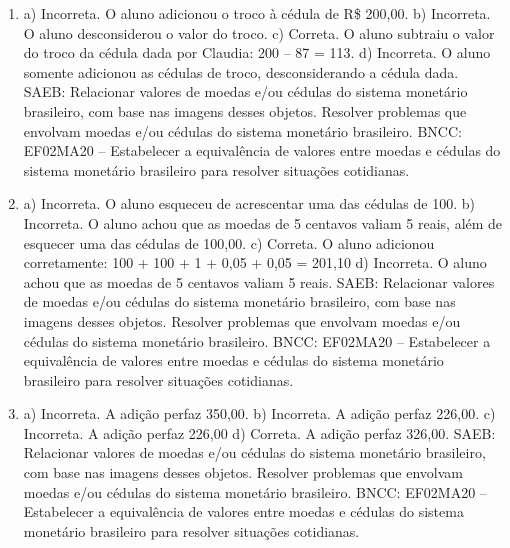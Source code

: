 \begin{enumerate}
\item
a) Incorreta. O aluno adicionou o troco à cédula de R\$ 200,00.
b) Incorreta. O aluno desconsiderou o valor do troco.
c) Correta. O aluno subtraiu o valor do troco da cédula dada por Claudia: 200 -- 87 = 113.
d) Incorreta. O aluno somente adicionou as cédulas de troco, desconsiderando a cédula dada.
SAEB: Relacionar valores de moedas e/ou cédulas do sistema
monetário brasileiro, com base nas imagens desses objetos.
Resolver problemas que envolvam moedas e/ou cédulas do sistema
monetário brasileiro.
BNCC: EF02MA20 -- Estabelecer a equivalência de valores entre moedas e cédulas do sistema monetário brasileiro para resolver situações cotidianas.

\item
a) Incorreta. O aluno esqueceu de acrescentar uma das cédulas de 100.
b) Incorreta. O aluno achou que as moedas de 5 centavos valiam 5 reais, além de esquecer uma das cédulas de 100,00.
c) Correta. O aluno adicionou corretamente: 100 + 100 + 1 + 0,05 + 0,05 = 201,10
d) Incorreta. O aluno achou que as moedas de 5 centavos valiam 5 reais.
SAEB: Relacionar valores de moedas e/ou cédulas do sistema
monetário brasileiro, com base nas imagens desses objetos.
Resolver problemas que envolvam moedas e/ou cédulas do sistema monetário brasileiro.
BNCC: EF02MA20 -- Estabelecer a equivalência de valores entre moedas e
cédulas do sistema monetário brasileiro para resolver situações cotidianas.

\item
a) Incorreta. A adição perfaz 350,00.
b) Incorreta. A adição perfaz 226,00.
c) Incorreta. A adição perfaz 226,00
d) Correta. A adição perfaz 326,00.
SAEB: Relacionar valores de moedas e/ou cédulas do sistema
monetário brasileiro, com base nas imagens desses objetos.
Resolver problemas que envolvam moedas e/ou cédulas do sistema
monetário brasileiro.
BNCC: EF02MA20 -- Estabelecer a equivalência de valores entre moedas e cédulas do sistema monetário brasileiro para resolver situações cotidianas.
\end{enumerate}


